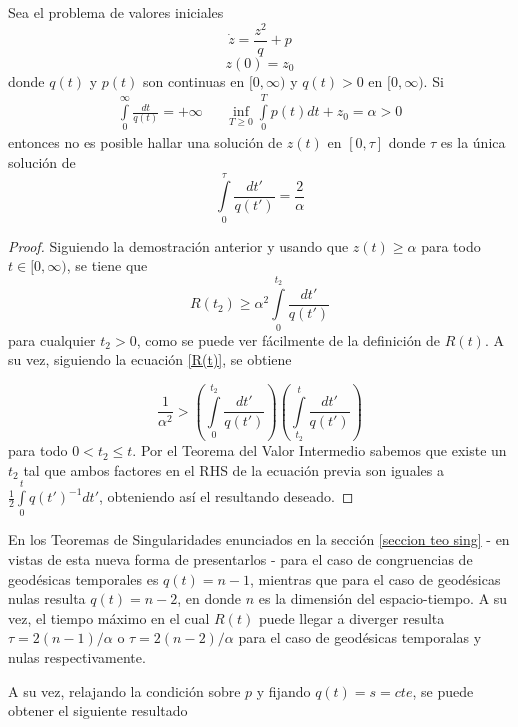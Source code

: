 \begin{lemma}\label{lema Riccati 2}
Sea el problema de valores iniciales
$$
\dot{z}=\frac{z^2}{q} + p
$$
$$
z(0)=z_0
$$
donde $q(t)$ y $p(t)$ son continuas en $[0,\infty)$ y $q(t)>0$ en $[0,\infty)$. Si
\begin{align*}
    \int\limits_0^\infty \frac{dt}{q(t)}=+\infty & & \inf_{T\geq 0}\int\limits_0^T p(t)dt + z_0 = \alpha > 0 
\end{align*}
entonces no es posible hallar una solución de $z(t)$ en $[0,\tau]$ donde $\tau$ es la única solución de 
$$
\int\limits_0^\tau \frac{dt'}{q(t')}=\frac{2}{\alpha}
$$
\end{lemma}
\begin{proof}
Siguiendo la demostración anterior y usando que $z(t)\geq\alpha$ para todo $t\in[0,\infty)$, se tiene que
$$
R(t_2)\geq\alpha^2\int\limits_0^{t_2}\frac{dt'}{q(t')}
$$
para cualquier $t_2>0$, como se puede ver fácilmente de la definición de $R(t)$. A su vez, siguiendo la ecuación \ref{R(t)}, se obtiene

$$
\frac{1}{\alpha^2} > \left( \int\limits_0^{t_2} \frac{dt'}{q(t')}\right) \left(\int\limits_{t_2}^t \frac{dt'}{q(t')}\right)
$$
para todo $0<t_2\leq t$. Por el Teorema del Valor Intermedio sabemos que existe un $t_2$ tal que ambos factores en el RHS de la ecuación previa son iguales a $\frac{1}{2}\int\limits_0^t q(t')^{-1}dt'$, obteniendo así el resultando deseado.  
\end{proof}

En los Teoremas de Singularidades enunciados en la sección \ref{seccion teo sing} - en vistas de esta nueva forma de presentarlos - para el caso de congruencias de geodésicas temporales es $q(t)=n-1$, mientras que para el caso de geodésicas nulas resulta $q(t)=n-2$, en donde $n$ es la dimensión del espacio-tiempo. A su vez, el tiempo máximo en el cual $R(t)$ puede llegar a diverger resulta $\tau=2(n-1)/\alpha$ o $\tau=2(n-2)/\alpha$ para el caso de geodésicas temporalas y nulas respectivamente. 

A su vez, relajando la condición sobre $p$ y fijando $q(t)=s=cte$, se puede obtener el siguiente resultado

